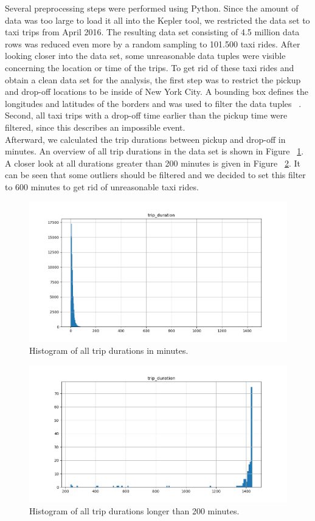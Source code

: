 \documentclass[sigconf, authorversion, nonacm=true]{acmart}
\begin{document}
Several preprocessing steps were performed using Python. Since the amount of data was too large to load it all into the Kepler tool, we restricted the data set to taxi trips from April 2016. The resulting data set consisting of 4.5 million data rows was reduced even more by a random sampling to 101.500 taxi rides. After looking closer into the data set, some unreasonable data tuples were visible concerning the location or time of the trips. To get rid of these taxi rides and obtain a clean data set for the analysis, the first step was to restrict the pickup and drop-off locations to be inside of New York City. A bounding box defines the longitudes and latitudes of the borders and was used to filter the data tuples ~\citep{boundingbox}. Second, all taxi trips with a drop-off time earlier than the pickup time were filtered, since this describes an impossible event.\\
Afterward, we calculated the trip durations between pickup and drop-off in minutes. An overview of all trip durations in the data set is shown in Figure ~\ref{fig:hist_dur_all}. A closer look at all durations greater than 200 minutes is given in Figure ~\ref{fig:hist_dur_out}. It can be seen that some outliers should be filtered and we decided to set this filter to 600 minutes to get rid of unreasonable taxi rides.


\begin{figure}[h]
  \centering
  \includegraphics[width=\linewidth]{hist_duration_all}
  \caption{Histogram of all trip durations in minutes.}
  \label{fig:hist_dur_all}
\end{figure}

\begin{figure}[h]
  \centering
  \includegraphics[width=\linewidth]{hist_duration_outliers}
  \caption{Histogram of all trip durations longer than 200 minutes.}
  \label{fig:hist_dur_out}
\end{figure}
\end{document}
